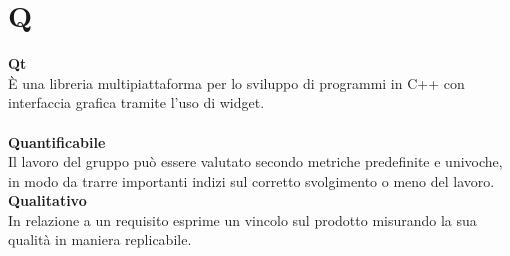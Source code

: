 \section{Q}
\textbf{Qt}\\
È una libreria multipiattaforma per lo sviluppo di programmi in C++ con interfaccia grafica tramite l'uso di widget. \\ \\
\textbf{Quantificabile} \\
Il lavoro del gruppo può essere valutato secondo metriche predefinite e univoche, in modo da trarre importanti indizi sul corretto svolgimento o meno del lavoro. \\
\textbf{Qualitativo}\\
In relazione a un requisito esprime un vincolo sul prodotto misurando la sua qualità in maniera replicabile. 
\clearpage
